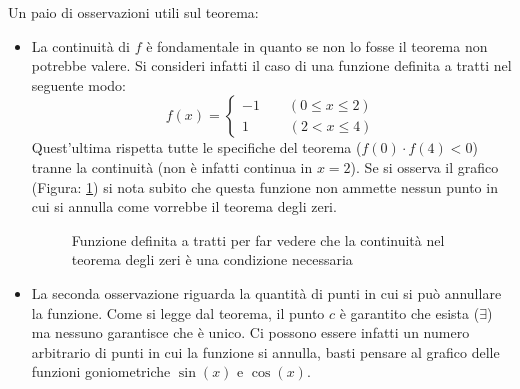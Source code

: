 \thm {
\begin{equation*}
f:[a,b] \to \mathbb{R}\;\; \text{continua, }\; f(a) \cdot f(b) < 0 \implies 
  \exists c \in ]a,b[ : f(c) = 0
\end{equation*}
}
Un paio di osservazioni utili sul teorema:
\begin{itemize}
    \item La continuità di $f$ è fondamentale in quanto se non lo fosse il 
      teorema non potrebbe valere. Si consideri infatti il caso di una funzione 
      definita a tratti nel seguente modo:
    \begin{equation*}
        f(x) =
        \begin{cases*}
            -1 \qquad (0 \leq x \leq 2)\\
            1   \qquad \;\;\;(2 < x \leq 4)
        \end{cases*}
    \end{equation*}
    Quest'ultima rispetta tutte le specifiche del teorema ($f(0) \cdot f(4) 
    < 0$) tranne la continuità (non è infatti continua in $x = 2$). Se si 
    osserva il grafico (Figura: \ref{fig_teoraZeri}) si nota subito che questa 
    funzione non ammette nessun punto in cui si annulla come vorrebbe il teorema 
    degli zeri.

    \begin{figure}[h]
        \centering


	\caption{Funzione definita a tratti per far vedere che la continuità nel 
      teorema degli zeri è una condizione necessaria}
        \label{fig_teoraZeri}
    \end{figure}

    \item La seconda osservazione riguarda la quantità di punti in cui si può 
      annullare la funzione. Come si legge dal teorema, il punto $c$ è garantito 
      che esista ($\exists$) ma nessuno garantisce che è unico. Ci possono 
      essere infatti un numero arbitrario di punti in cui la funzione si 
      annulla, basti pensare al grafico delle funzioni goniometriche $\sin(x)$ 
      e $\cos(x)$.
\end{itemize}


